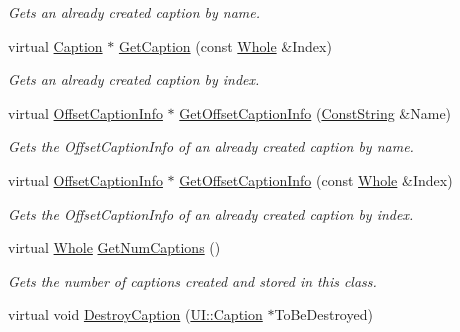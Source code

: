 \begin{DoxyCompactItemize}
\begin{DoxyCompactList}\small\item\em Gets an already created caption by name. \item\end{DoxyCompactList}\item 
virtual \hyperlink{classphys_1_1UI_1_1Caption}{Caption} $\ast$ \hyperlink{classphys_1_1UI_1_1Window_a658864b36968fce9ab09f3d5cb14b21a}{GetCaption} (const \hyperlink{namespacephys_a460f6bc24c8dd347b05e0366ae34f34a}{Whole} \&Index)
\begin{DoxyCompactList}\small\item\em Gets an already created caption by index. \item\end{DoxyCompactList}\item 
virtual \hyperlink{structphys_1_1UI_1_1ResizingInfo}{OffsetCaptionInfo} $\ast$ \hyperlink{classphys_1_1UI_1_1Window_afa081532c017f5e8c4f04bfd2df207b6}{GetOffsetCaptionInfo} (\hyperlink{namespacephys_a5ce5049f8b4bf88d6413c47b504ebb31}{ConstString} \&Name)
\begin{DoxyCompactList}\small\item\em Gets the OffsetCaptionInfo of an already created caption by name. \item\end{DoxyCompactList}\item 
virtual \hyperlink{structphys_1_1UI_1_1ResizingInfo}{OffsetCaptionInfo} $\ast$ \hyperlink{classphys_1_1UI_1_1Window_a64dc0b65518151f3f36bb4ad40505804}{GetOffsetCaptionInfo} (const \hyperlink{namespacephys_a460f6bc24c8dd347b05e0366ae34f34a}{Whole} \&Index)
\begin{DoxyCompactList}\small\item\em Gets the OffsetCaptionInfo of an already created caption by index. \item\end{DoxyCompactList}\item 
virtual \hyperlink{namespacephys_a460f6bc24c8dd347b05e0366ae34f34a}{Whole} \hyperlink{classphys_1_1UI_1_1Window_a125d78e98b47a4d93f6414545fd2374c}{GetNumCaptions} ()
\begin{DoxyCompactList}\small\item\em Gets the number of captions created and stored in this class. \item\end{DoxyCompactList}\item 
virtual void \hyperlink{classphys_1_1UI_1_1Window_a4e3dbe56ca1efce7ac1d26ceb8f7e915}{DestroyCaption} (\hyperlink{classphys_1_1UI_1_1Caption}{UI::Caption} $\ast$ToBeDestroyed)

\end{DoxyCompactItemize}
